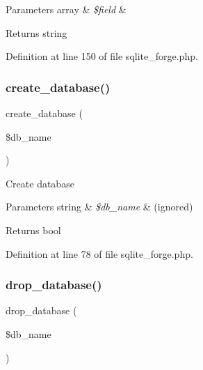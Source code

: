 \begin{DoxyParams}[1]{Parameters}
array & {\em \$field} & \\
\hline
\end{DoxyParams}
\begin{DoxyReturn}{Returns}
string 
\end{DoxyReturn}


Definition at line 150 of file sqlite\+\_\+forge.\+php.

\mbox{\label{class_c_i___d_b__sqlite__forge_a902a7267babceb2ce595706f217e00ad}} 
\subsubsection{\texorpdfstring{create\_database()}{create\_database()}}
{\footnotesize\ttfamily create\+\_\+database (\begin{DoxyParamCaption}\item[{}]{\$db\+\_\+name }\end{DoxyParamCaption})}

Create database


\begin{DoxyParams}[1]{Parameters}
string & {\em \$db\+\_\+name} & (ignored) \\
\hline
\end{DoxyParams}
\begin{DoxyReturn}{Returns}
bool 
\end{DoxyReturn}


Definition at line 78 of file sqlite\+\_\+forge.\+php.

\mbox{\label{class_c_i___d_b__sqlite__forge_a9612987b2d4230de2638d15857e92e67}} 
\subsubsection{\texorpdfstring{drop\_database()}{drop\_database()}}
{\footnotesize\ttfamily drop\+\_\+database (\begin{DoxyParamCaption}\item[{}]{\$db\+\_\+name }\end{DoxyParamCaption})}

